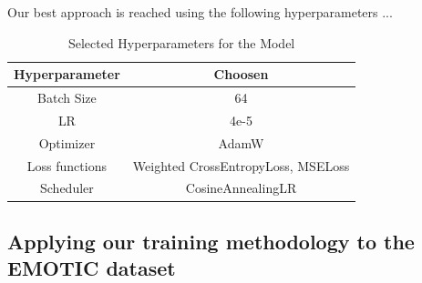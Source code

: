 \documentclass[conference]{IEEEtran}
\begin{document}
Our best approach is reached using the following hyperparameters ...

\begin{table}[htbp]
\centering
\begin{tabular}{c | c }
 Hyperparameter & Choosen \\ 
  \hline
 Batch Size & 64 \\
 \hline
 LR & 4e-5 \\
 \hline
  Optimizer & AdamW \\
 \hline
 Loss functions & Weighted CrossEntropyLoss, MSELoss \\
 \hline
 Scheduler & CosineAnnealingLR \\
\end{tabular}
\caption{Selected Hyperparameters for the Model}
\label{tab:hyperparameters}
\end{table}

\newpage
\subsection{Applying our training methodology to the EMOTIC dataset}


\newpage
\end{document}
